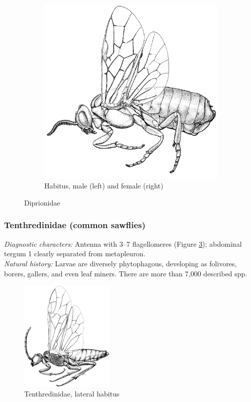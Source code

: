 \documentclass[letterpaper, 11pt]{article}
\begin{document}
\begin{figure}[ht!]
\begin{subfigure}[ht!]{0.42\textwidth}
        \includegraphics[width=\textwidth]{DiprionidHabitus}
        \caption{Habitus, male (left) and female (right)}
        \label{fig:diprionid2}
    \end{subfigure}
    \caption{Diprionidae \citep[][pg. 108 (a) and Fig. 29 (b)]{goulet1993hymenoptera}}\label{fig:diprion}
\end{figure}

\subsubsection{Tenthredinidae (common sawflies)}
\noindent{}\textit{Diagnostic characters:} Antenna with 3--7 flagellomeres (Figure \ref{fig:tenthred1}); abdominal tergum 1 clearly separated from metapleuron.\\

\noindent{}\textit{Natural history:} Larvae are diversely phytophagous, developing as folivores, borers, gallers, and even leaf miners. There are more than 7,000 described spp.\\

\begin{figure}[ht!]
  \centering
    \includegraphics[width=0.4\textwidth]{TenthredinidHabitus}
  \caption{Tenthredinidae, lateral habitus \citep[][Fig. 31]{goulet1993hymenoptera}}
  \label{fig:tenthred1}
\end{figure}
\end{document}
